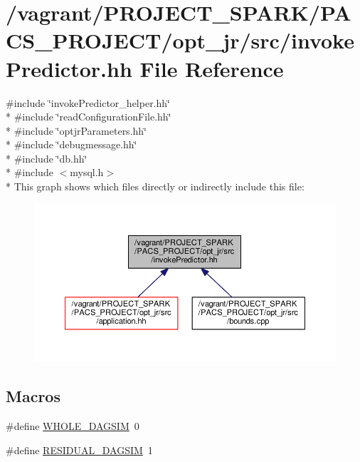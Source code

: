 \hypertarget{invokePredictor_8hh}{\section{/vagrant/\-P\-R\-O\-J\-E\-C\-T\-\_\-\-S\-P\-A\-R\-K/\-P\-A\-C\-S\-\_\-\-P\-R\-O\-J\-E\-C\-T/opt\-\_\-jr/src/invoke\-Predictor.hh File Reference}
\label{invokePredictor_8hh}
}
{\ttfamily \#include \char`\"{}invoke\-Predictor\-\_\-helper.\-hh\char`\"{}}\\*
{\ttfamily \#include \char`\"{}read\-Configuration\-File.\-hh\char`\"{}}\\*
{\ttfamily \#include \char`\"{}optjr\-Parameters.\-hh\char`\"{}}\\*
{\ttfamily \#include \char`\"{}debugmessage.\-hh\char`\"{}}\\*
{\ttfamily \#include \char`\"{}db.\-hh\char`\"{}}\\*
{\ttfamily \#include $<$mysql.\-h$>$}\\*
This graph shows which files directly or indirectly include this file\-:\nopagebreak
\begin{figure}[H]
\begin{center}
\leavevmode
\includegraphics[width=350pt]{invokePredictor_8hh__dep__incl}
\end{center}
\end{figure}
\subsection*{Macros}
\begin{DoxyCompactItemize}
\item 
\#define \hyperlink{invokePredictor_8hh_a3806de5f70b6971cfe8be82520f4bf2a}{W\-H\-O\-L\-E\-\_\-\-D\-A\-G\-S\-I\-M}~0
\item 
\#define \hyperlink{invokePredictor_8hh_a016c9fba38e790ceafd4d9843f2dc564}{R\-E\-S\-I\-D\-U\-A\-L\-\_\-\-D\-A\-G\-S\-I\-M}~1
\end{DoxyCompactItemize}
